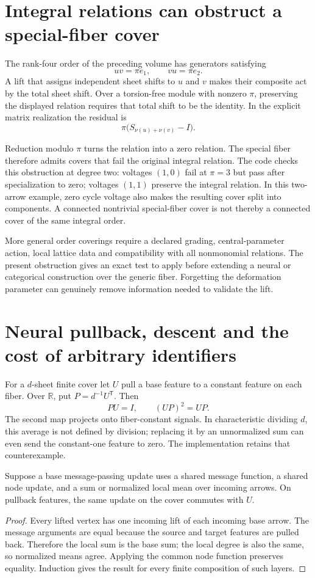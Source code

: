 \section{Integral relations can obstruct a special-fiber cover}

The rank-four order of the preceding volume has generators satisfying
\[
 uv=\pi e_1,\qquad vu=\pi e_2.
\]
A lift that assigns independent sheet shifts to $u$ and $v$ makes their composite act by the total sheet shift. Over a torsion-free module with nonzero $\pi$, preserving the displayed relation requires that total shift to be the identity. In the explicit matrix realization the residual is
\[
 \pi\bigl(S_{\nu(u)+\nu(v)}-I\bigr).
\]

Reduction modulo $\pi$ turns the relation into a zero relation. The special fiber therefore admits covers that fail the original integral relation. The code checks this obstruction at degree two: voltages $(1,0)$ fail at $\pi=3$ but pass after specialization to zero; voltages $(1,1)$ preserve the integral relation. In this two-arrow example, zero cycle voltage also makes the resulting cover split into components. A connected nontrivial special-fiber cover is not thereby a connected cover of the same integral order.

More general order coverings require a declared grading, central-parameter action, local lattice data and compatibility with all nonmonomial relations. The present obstruction gives an exact test to apply before extending a neural or categorical construction over the generic fiber. Forgetting the deformation parameter can genuinely remove information needed to validate the lift.

\section{Neural pullback, descent and the cost of arbitrary identifiers}

For a $d$-sheet finite cover let $U$ pull a base feature to a constant feature on each fiber. Over $\mathbb R$, put $P=d^{-1}U^{\mathsf T}$. Then
\[
 PU=I,\qquad (UP)^2=UP.
\]
The second map projects onto fiber-constant signals. In characteristic dividing $d$, this average is not defined by division; replacing it by an unnormalized sum can even send the constant-one feature to zero. The implementation retains that counterexample.

\begin{proposition}
Suppose a base message-passing update uses a shared message function, a shared node update, and a sum or normalized local mean over incoming arrows. On pullback features, the same update on the cover commutes with $U$.
\end{proposition}
\begin{proof}
Every lifted vertex has one incoming lift of each incoming base arrow. The message arguments are equal because the source and target features are pulled back. Therefore the local sum is the base sum; the local degree is also the same, so normalized means agree. Applying the common node function preserves equality. Induction gives the result for every finite composition of such layers.
\end{proof}

